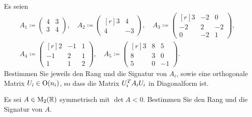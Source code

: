 \documentclass[a4paper, 10pt]{scrartcl}
\begin{document}
\begin{question}
  Es seien
  \begin{gather*}
              A_1
    \coloneqq \begin{pmatrix}
                4 & 3 \\
                3 & 4
              \end{pmatrix},
    \quad    
              A_2
    \coloneqq \begin{pmatrix*}[r]
                3 &   4 \\
                4 &  -3
              \end{pmatrix*},
    \quad     A_3
    \coloneqq \begin{pmatrix*}[r]
                 3  & -2  &  0  \\
                -2  &  2  & -2  \\
                 0  & -2  &  1
              \end{pmatrix*},
    \\
              A_4
    \coloneqq \begin{pmatrix*}[r]
                 2  & -1  & 1 \\
                -1  &  2  & 1 \\
                 1  &  1  & 2
              \end{pmatrix*},
    \quad
              A_5
    \coloneqq \begin{pmatrix*}[r]
                3 & 8 &  5  \\
                8 & 3 &  0  \\
                5 & 0 & -1
              \end{pmatrix*}.
  \end{gather*}
  Bestimmen Sie jeweils den Rang und die Signatur von $A_i$, sowie eine orthogonale Matrix $U_i \in \operatorname{O}(n_i)$, so dass die Matrix $U_i^T A_i U_i$ in Diagonalform ist.
\end{question}


\begin{question}
  Es sei $A \in \operatorname{M}_{2}(\mathbb{R})$ symmetrisch mit $\det A < 0$.
  Bestimmen Sie den Rang und die Signatur von $A$.
\end{question}
\end{document}

